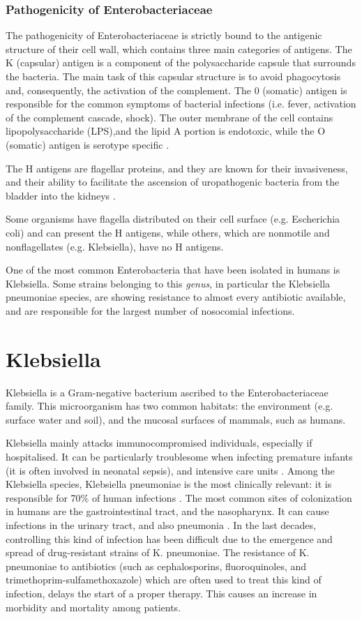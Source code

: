 \documentclass[11pt]{report}
\begin{document}
\subsubsection{Pathogenicity of Enterobacteriaceae}

The pathogenicity of Enterobacteriaceae is strictly bound to the antigenic structure of their cell wall, which contains three main categories of antigens.
The K (capsular) antigen is a component of the polysaccharide capsule that surrounds the bacteria. 
The main task of this capsular structure is to avoid phagocytosis and, consequently, the activation of the complement.
The 0 (somatic) antigen is responsible for the common symptoms of bacterial infections (i.e. fever, activation of the complement cascade, shock).
The outer membrane of the cell contains lipopolysaccharide (LPS),and the lipid A portion is endotoxic, while the O (somatic) antigen is serotype specific \cite{guentzel1996escherichia}.

The H antigens are flagellar proteins, and they are known for their invasiveness, and their ability to facilitate the ascension of uropathogenic bacteria from the bladder into the kidneys \cite{wiles2008origins}.

Some organisms have flagella distributed on their cell surface (e.g. Escherichia coli) and can present the H antigens, while others, which are nonmotile and nonflagellates (e.g. Klebsiella), have no H antigens. 

One of the most common Enterobacteria that have been isolated in humans is Klebsiella. Some strains belonging to this \emph{genus}, in particular the Klebsiella pneumoniae species, are showing resistance to almost every antibiotic available, and are responsible for the largest number of nosocomial infections. 

\section{Klebsiella}
Klebsiella is a Gram-negative bacterium ascribed to the Enterobacteriaceae family. 
This microorganism has two common habitats: the environment (e.g. surface water and soil), and the mucosal surfaces of mammals, such as humans.

Klebsiella mainly attacks immunocompromised individuals, especially if hospitalised. It can be particularly troublesome when infecting premature infants (it is often involved in neonatal sepsis), and intensive care units \cite{podschun1998klebsiella}.
Among the Klebsiella species, Klebsiella pneumoniae is the most clinically relevant: it is responsible for 70$\%$ of human infections \cite{Pitout2015}.
The most common sites of colonization in humans are the gastrointestinal tract, and the nasopharynx. It can cause infections in the urinary tract, and also pneumonia \cite{Pitout2015, podschun1998klebsiella}.
In the last decades, controlling this kind of infection has been difficult due to the emergence and spread of drug-resistant strains of K. pneumoniae.
The resistance of K. pneumoniae to antibiotics (such as cephalosporins, fluoroquinoles, and trimethoprim-sulfamethoxazole) which are often used to treat this kind of infection, delays the start of a proper therapy. This causes an increase in morbidity and mortality among patients.
\end{document}

